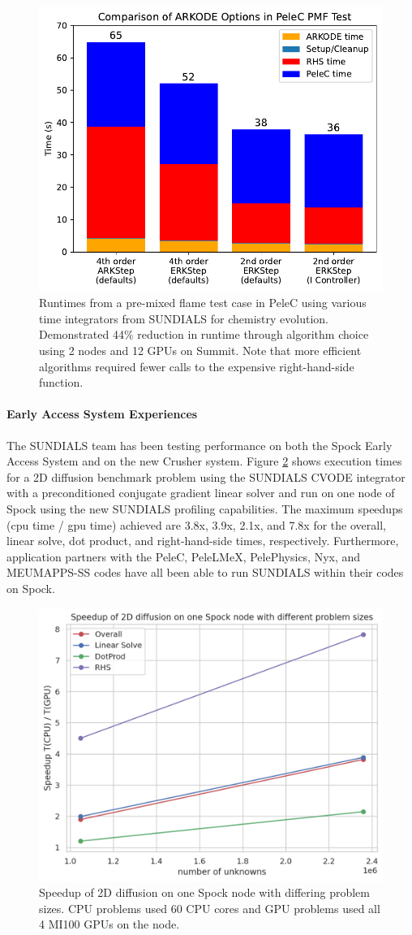 \begin{figure}[htb]
  \centering
  \includegraphics[width=0.6\linewidth]{projects/2.3.3-MathLibs/2.3.3.12-SUNDIALS-hypre/PeleC_fig.pdf}
  \caption{\label{fig:sun-many-demo} Runtimes from a pre-mixed flame test case
  in PeleC using various time integrators from SUNDIALS for chemistry evolution.
  Demonstrated 44\% reduction in runtime through algorithm choice using 2 nodes
  and 12 GPUs on Summit. Note that more efficient algorithms required fewer
  calls to the expensive right-hand-side function.}
\end{figure}

\paragraph{Early Access System Experiences}
The SUNDIALS team has been testing performance on both the Spock Early Access System and on the new Crusher system.  Figure \ref{fig:sun-spock-12-21} shows execution times for a 2D diffusion benchmark problem using the SUNDIALS CVODE integrator with a preconditioned conjugate gradient linear solver and run on one node of Spock using the new SUNDIALS profiling capabilities.  The maximum speedups (cpu time / gpu time) achieved are 3.8x, 3.9x, 2.1x, and 7.8x for the overall, linear solve, dot product, and right-hand-side times, respectively.  Furthermore, application partners with the PeleC, PeleLMeX, PelePhysics, Nyx, and MEUMAPPS-SS codes have all been able to run SUNDIALS within their codes on Spock. 

\begin{figure}[htb]
	\centering
	\includegraphics[width=0.6\linewidth]{SpockResults-Dec2021.png}
	\caption{\label{fig:sun-spock-12-21} Speedup of 2D diffusion on one Spock node with differing problem sizes.  CPU problems used 60 CPU cores and GPU problems used all 4 MI100 GPUs on the node.}
\end{figure}

